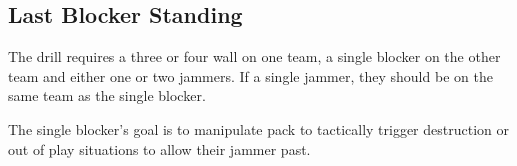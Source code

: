 \subsection*{Last Blocker Standing}
\label{drill:scenario/last_blocker_standing}

The drill requires a three or four wall on one team, a single blocker on the other team and either one or two jammers.
If a single jammer, they should be on the same team as the single blocker.

The single blocker's goal is to manipulate pack to tactically trigger destruction or out of play situations to allow their jammer past.  

